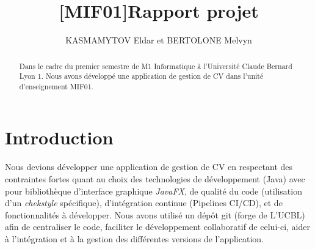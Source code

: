 \documentclass{article}
\title{[MIF01]Rapport projet}
\author{KASMAMYTOV Eldar et BERTOLONE Melvyn}
\begin{document}
\maketitle

\begin{abstract}
Dans le cadre du premier semestre de M1 Informatique à l'Université Claude Bernard Lyon 1. Nous avons développé une application de gestion de CV dans l'unité d'enseignement MIF01.

\end{abstract}

\section{Introduction}
Nous devions développer une application de gestion de CV en respectant des contraintes fortes quant au choix des technologies de développement (Java) avec pour bibliothèque d'interface graphique \textit{JavaFX}, de qualité du code (utilisation d'un \textit{chekstyle} spécifique), d'intégration continue (Pipelines CI/CD), et de fonctionnalités à développer. Nous avons utilisé un dépôt git (forge de L'UCBL) afin de centraliser le code, faciliter le développement collaboratif de celui-ci, aider à l'intégration et à la gestion des différentes versions de l'application.
\end{document}
